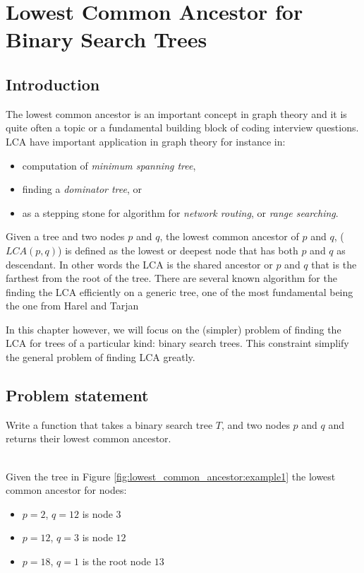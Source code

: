 %

\chapter{Lowest Common Ancestor for Binary Search Trees}
\label{ch:lowest_common_ancestor}
\section*{Introduction}
The lowest common ancestor is an important concept in graph theory and it is
quite often a topic or a fundamental building block of coding interview questions.
LCA have important application in graph theory for instance in:
\begin{itemize}
	\item computation of \textit{minimum spanning tree},
	\item finding a \textit{dominator tree}, or
	\item as a stepping stone for algorithm for \textit{network routing}, or \textit{range searching}.
\end{itemize}
Given a tree and two nodes $p$ and $q$, the lowest common ancestor  of $p$ and $q$, ($LCA(p,q)$) is defined as the lowest or deepest node that has both $p$ and $q$ as descendant.
In other words the LCA is the shared ancestor or $p$ and $q$ that is the farthest from the root of the tree.
There are several known algorithm for the finding the LCA efficiently on a generic tree, one of the most fundamental being the one from Harel and Tarjan \cite{harel84,harel80}

In this chapter however, we will focus on the (simpler) problem of finding the LCA for  trees of a particular kind: binary search trees. 
This constraint simplify the general problem of finding LCA greatly. 
\section{Problem statement}
\begin{exercise}
	Write a function that takes a binary search tree $T$, and two nodes $p$ and $q$ and returns their lowest common ancestor.

	\begin{example}
		\hfill \\
		Given the tree in Figure \ref{fig:lowest_common_ancestor:example1} the lowest common ancestor for nodes:
		\begin{itemize}
			\item $p = 2$, $q=12$ is node $3$
			\item $p = 12$, $q=3$ is node $12$
			\item $p = 18$, $q=1$ is the root node $13$
		\end{itemize}
		\label{ex:lower_common_ancestor:example1}
	\end{example}
\end{exercise}

